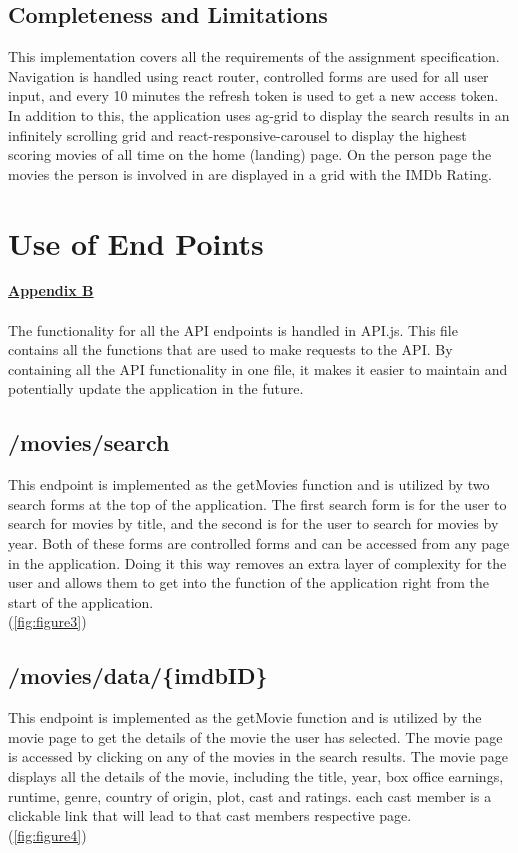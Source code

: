 \documentclass[12pt,a4paper]{article}
\begin{document}
		\subsection{Completeness and Limitations}
			This implementation covers all the requirements of the assignment specification. 
			Navigation is handled using react router, controlled forms are used for all user input, and 
			every 10 minutes the refresh token is used to get a new access token. In addition to this, 
			the application uses ag-grid to display the search results in an infinitely scrolling grid 
			and react-responsive-carousel to display the highest scoring movies of all time on the 
			home (landing) page. On the person page the movies the person is involved in are displayed 
			in a grid with the IMDb Rating.\\

	\section{Use of End Points}
		\hyperref[subsec:appendixB]{\textbf{Appendix B}}\\
		\\
		The functionality for all the API endpoints is handled in API.js. This file contains all the 
		functions that are used to make requests to the API. By containing all the API functionality 
		in one file, it makes it easier to maintain and potentially update the application in the 
		future.\\

		\subsection{/movies/search}
			This endpoint is implemented as the getMovies function and is utilized by two 
			search forms at the top of the application. The first search form is for the user to search 
			for movies by title, and the second is for the user to search for movies by year. Both of 
			these forms are controlled forms and can be accessed from any page in the application. Doing 
			it this way removes an extra layer of complexity for the user and allows them to get into the 
			function of the application right from the start of	the application.\\
			(\cref{fig:figure3})

		\subsection{/movies/data/\{imdbID\}}
			This endpoint is implemented as the getMovie function and is utilized by the movie page to 
			get the details of the movie the user has selected. The movie page is accessed by clicking 
			on any of the movies in the search results. The movie page displays all the details of the 
			movie, including the title, year, box office earnings, runtime, genre, country of origin, 
			plot, cast and ratings. each cast member is a clickable link that will lead to that cast 
			members respective page.\\
			(\cref{fig:figure4})
\end{document}
